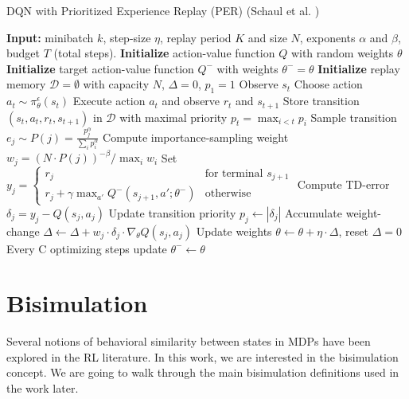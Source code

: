 \begin{algorithm}
\caption{DQN with Prioritized Experience Replay (PER) (Schaul et al. \cite{schaul2015prioritized})}
\label{algorithm:dqn_per}
\begin{algorithmic}[1]
\State \textbf{Input:} minibatch $k$, step-size $\eta$, replay period $K$ and size $N$, exponents $\alpha$ and $\beta$, budget $T$ (total steps).
\State \textbf{Initialize} action-value function $Q$ with random weights $\theta$
\State \textbf{Initialize} target action-value function $Q^-$ with weights $\theta^- = \theta$
\State \textbf{Initialize} replay memory $\mathcal{D} = \emptyset$ with capacity $N$, $\Delta = 0$, $p_1 = 1$
    \State Observe $s_t$
    \State Choose action $a_t \sim \pi^\epsilon_\theta(s_t)$
    \State Execute action $a_t$ and observe $r_t$ and $s_{t+1}$
    \State Store transition $(s_t, a_t, r_t, s_{t+1})$ in $\mathcal{D}$ with maximal priority $p_t = \max_{i < t} p_i$
            \State Sample transition $e_j \sim P(j) = \frac{p_j^\alpha}{\sum_i p_i^\alpha}$
            \State Compute importance-sampling weight $w_j = \left( N \cdot P(j) \right)^{-\beta} / \max_i w_i$
            \State Set $y_j = 
            \begin{cases} 
                r_j & \text{for terminal } s_{j+1}\\
                r_j + \gamma \max_{a'} Q^-(s_{j+1}, a'; \theta^-) & \text{otherwise}
            \end{cases}$
            \State Compute TD-error $\delta_j = y_j - Q(s_{j}, a_{j})$
            \State Update transition priority $p_j \leftarrow |\delta_j|$
            \State Accumulate weight-change $\Delta \leftarrow \Delta + w_j \cdot \delta_j \cdot \nabla_\theta Q(s_{j}, a_{j})$
        \EndFor
        \State Update weights $\theta \leftarrow \theta + \eta \cdot \Delta$, reset $\Delta = 0$
        \State Every C optimizing steps update $\theta^- \leftarrow \theta$
    \EndIf
\EndFor
\end{algorithmic}
\end{algorithm}

\section{Bisimulation}
\label{sec:bisimulation_background}

Several notions of behavioral similarity between states in MDPs have been explored in the RL literature. In this work, we are interested in the bisimulation concept. We are going to walk through the main bisimulation definitions used in the work later.

